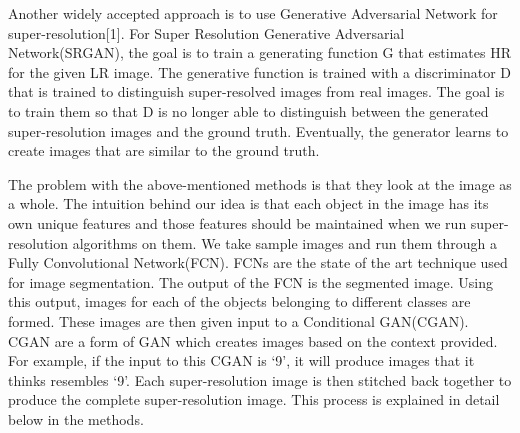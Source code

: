 Another widely accepted approach is to use Generative Adversarial Network for super-resolution[1]. For Super Resolution Generative Adversarial Network(SRGAN), the goal is to train a generating function G that estimates HR for the given LR image. The generative function is trained with a discriminator D that is trained to distinguish super-resolved images from real images. The goal is to train them so that D is no longer able to distinguish between the generated super-resolution images and the ground truth. Eventually, the generator learns to create images that are similar to the ground truth.

The problem with the above-mentioned methods is that they look at the image as a whole. The intuition behind our idea is that each object in the image has its own unique features and those features should be maintained when we run super-resolution algorithms on them. We take sample images and run them through a Fully Convolutional Network(FCN). FCNs are the state of the art technique used for image segmentation. The output of the FCN is the segmented image. Using this output, images for each of the objects belonging to different classes are formed. These images are then given input to a Conditional GAN(CGAN). CGAN are a form of GAN which creates images based on the context provided. For example, if the input to this CGAN is ‘9’, it will produce images that it thinks resembles ‘9’. Each super-resolution image is then stitched back together to produce the complete super-resolution image. This process is explained in detail below in the methods. 
